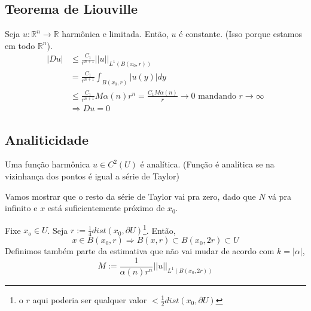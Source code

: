 \documentclass[11pt]{article}
\newcommand{\Rn}{{\mathbb{R}^n}}
\newcommand{\p}{\partial}
\begin{document}
\subsection{Teorema de Liouville}
Seja \( u: \mathbb{R}^n \rightarrow \mathbb{R}  \) harmônica e limitada. Então, \( u \) é constante. (Isso porque estamos em todo \( \Rn \)). \begin{align*}
	 | Du | &\leq \frac{C_1}{r^{n+1}} || u ||_{L^1 (B(x_0, r))} \\
	 &= \frac{C_1}{r^{n+1}} \int_{B(x_0, r)} | u(y) | dy \\ &\leq \frac{C_1}{r^{n+1}} M \alpha (n) r^n = \frac{C_1 M \alpha(n) }{r} \rightarrow 0 \text{ mandando } r \rightarrow \infty \\
	 &\Rightarrow Du = 0 
\end{align*}


\subsection{Analiticidade}

Uma função harmônica \( u \in C^2(U) \) é analítica. (Função é analítica se na vizinhança dos pontos é igual a série de Taylor)

Vamos mostrar que o resto da série de Taylor vai pra zero, dado que \( N \) vá pra infinito e \( x \) está suficientemente próximo de \( x_0 \).

Fixe \( x_o \in U \). Seja \( r := \frac{1}{4}dist(x_0, \p U) \)\footnote{o \( r \) aqui poderia ser qualquer valor \( < \frac{1}{2}dist(x_0, \p U) \) }. Então, \[  x \in B(x_0, r) \Rightarrow B(x,r) \subset B(x_0, 2r) \subset U \] Definimos também  parte da estimativa que não vai mudar de acordo com \( k = |\alpha| \), \[ M:= \frac{1}{\alpha(n)r^n} ||u||_{L^1(B(x_0,2r))}\]
\end{document}
